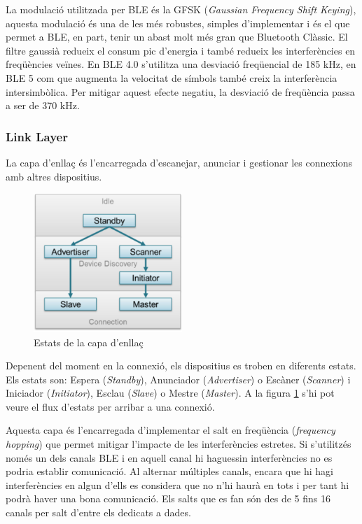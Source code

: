 La modulació utilitzada per BLE és la GFSK (\textit{Gaussian Frequency Shift Keying}), aquesta modulació és una de les més robustes, simples d'implementar i és el que permet a BLE, en part, tenir un abast molt més gran que Bluetooth Clàssic.
El filtre gaussià redueix el consum pic d'energia \cite{BLE_Review} i també redueix les interferències en freqüències veïnes.
En BLE 4.0 s'utilitza una desviació freqüencial de 185 kHz, en BLE 5 com que augmenta la velocitat de símbols també creix la interferència intersimbòlica.
Per mitigar aquest efecte negatiu, la desviació de freqüència passa a ser de 370 kHz.


\subsubsection{Link Layer}
La capa d'enllaç és l'encarregada d'escanejar, anunciar i gestionar les connexions amb altres dispositius.

\begin{figure}[!h]
	\begin{center}
		\includegraphics[width=0.5\textwidth]{./images/gap_state_diagram.png}
		\caption{Estats de la capa d'enllaç \cite{Link_Layer_states}}
		\label{Link_State_Diagram}
	\end{center}
\end{figure}

Depenent del moment en la connexió, els dispositius es troben en diferents estats.
Els estats son: Espera (\textit{Standby}), Anunciador (\textit{Advertiser}) o Escàner (\textit{Scanner}) i Iniciador (\textit{Initiator}), Esclau (\textit{Slave}) o Mestre (\textit{Master}).
A la figura \ref{Link_State_Diagram} s'hi pot veure el flux d'estats per arribar a una connexió.

Aquesta capa és l'encarregada d'implementar el salt en freqüència (\textit{frequency hopping}) que permet mitigar l'impacte de les interferències estretes.
Si s'utilitzés només un dels canals BLE i en aquell canal hi haguessin interferències no es podria establir comunicació.
Al alternar múltiples canals, encara que hi hagi interferències en algun d'ells es considera que no n'hi haurà en tots i per tant hi podrà haver una bona comunicació.
Els salts que es fan són des de 5 fins 16 canals per salt d'entre els dedicats a dades.

